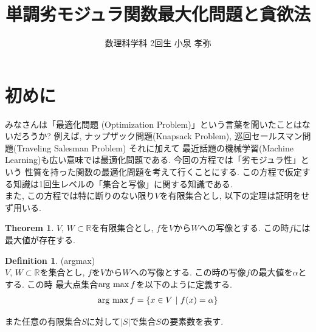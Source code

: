 \documentclass[11pt, a4paper, dvipdfmx]{jsarticle}
\title{単調劣モジュラ関数最大化問題と貪欲法}
\author{数理科学科 2回生 小泉 孝弥}
\date{}
\theoremstyle{definition}
\newtheorem{Definition+}[Axiom+]{Definition}
\newtheorem{Theorem+}[Axiom+]{Theorem}
\newcommand{\R}{\mathbb{R}}
\begin{document}
\maketitle
\section{初めに}
みなさんは「最適化問題 (Optimization Problem)」という言葉を聞いたことはないだろうか? 
例えば, ナップザック問題(Knapsack Problem), 巡回セールスマン問題(Traveling Salesman Problem) それに加えて
最近話題の機械学習(Machine Learning)も広い意味では最適化問題である. 今回の方程では「劣モジュラ性」という
性質を持った関数の最適化問題を考えて行くことにする. この方程で仮定する知識は1回生レベルの「集合と写像」に関する知識である.\\ \indent
 また, この方程では特に断りのない限り$V$を有限集合とし, 以下の定理は証明をせず用いる.
 \begin{Theorem+}
    $V$, $W$$\subset\R$を有限集合とし, $f$を$V$から$W$への写像とする. この時$f$には最大値が存在する.
 \end{Theorem+}
 \begin{Definition+}(argmax)\\
     $V$, $W$$\subset\R$を集合とし, $f$を$V$から$W$への写像とする. この時の写像$f$の最大値を$\alpha$とする. この時
     最大点集合$\mathop{\rm arg~max}\limits f$を以下のように定義する. 
     \begin{align*}
        \mathop{\rm arg~max}\limits f = \{x\in V~|~ f(x) = \alpha\}
     \end{align*}
    \end{Definition+}
    また任意の有限集合$S$に対して$|S|$で集合$S$の要素数を表す.    
\end{document}
